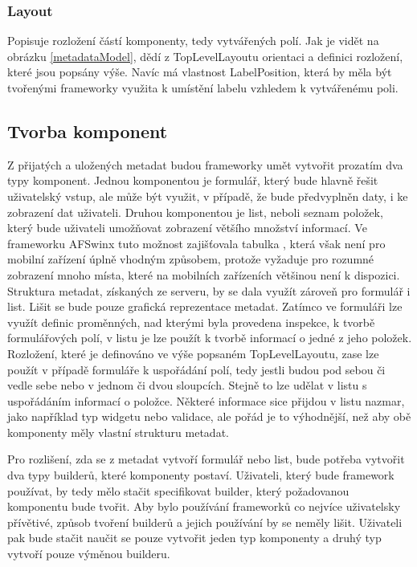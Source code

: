 \subsubsection{Layout}
Popisuje rozložení částí komponenty, tedy vytvářených polí. Jak je vidět na obrázku \ref{metadataModel}, dědí z TopLevelLayoutu orientaci a definici rozložení, které jsou popsány výše. Navíc má vlastnost LabelPosition, která by měla být tvořenými frameworky využita k umístění labelu vzhledem k vytvářenému poli.

\subsection{Tvorba komponent}
Z přijatých a uložených metadat budou frameworky umět vytvořit prozatím dva typy komponent. Jednou komponentou je formulář, který bude hlavně řešit uživatelský vstup, ale může být využit, v případě, že bude předvyplněn daty, i ke zobrazení dat uživateli. Druhou komponentou je list, neboli seznam položek, který bude uživateli umožňovat zobrazení většího množství informací. Ve frameworku AFSwinx tuto možnost zajišťovala tabulka \cite{tomasek-thesis}, která však není pro mobilní zařízení úplně vhodným způsobem, protože vyžaduje pro rozumné zobrazení mnoho místa, které na mobilních zařízeních většinou není k dispozici.
Struktura metadat, získaných ze serveru, by se dala využít zároveň pro formulář i list. Lišit se bude pouze grafická reprezentace metadat. Zatímco ve formuláři lze využít definic proměnných, nad kterými byla provedena inspekce, k tvorbě formulářových polí, v listu je lze použít k tvorbě informací o jedné z jeho položek. Rozložení, které je definováno ve výše popsaném TopLevelLayoutu, zase lze použít v případě formuláře k uspořádání polí, tedy jestli budou pod sebou či vedle sebe nebo v jednom či dvou sloupcích. Stejně to lze udělat v listu s uspořádáním informací o položce. Některé informace sice přijdou v listu nazmar, jako například typ widgetu nebo validace, ale pořád je to výhodnější, než aby obě komponenty měly vlastní strukturu metadat. 

Pro rozlišení, zda se z metadat vytvoří formulář nebo list, bude potřeba vytvořit dva typy builderů, které komponenty postaví. Uživateli, který bude framework používat, by tedy mělo stačit specifikovat builder, který požadovanou komponentu bude tvořit. Aby bylo používání frameworků co nejvíce uživatelsky přívětivé, způsob tvoření builderů a jejich používání by se neměly lišit. Uživateli pak bude stačit naučit se pouze vytvořit jeden typ komponenty a druhý typ vytvoří pouze výměnou builderu. 

